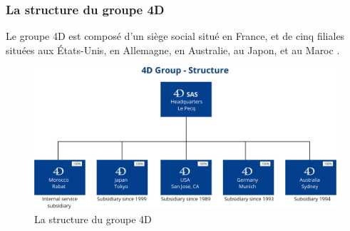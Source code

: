 


\subsubsection{La structure du groupe 4D}
Le groupe 4D est composé d’un siège social situé en France, et de cinq filiales situées
aux États-Unis, en Allemagne, en Australie, au Japon, et au Maroc \cite{4d}.

\begin{figure}[h]
    \centering
    \includegraphics[scale=0.32]{Images/groupe.png} %
    \caption{ La structure du groupe 4D\cite{4d}}
    \label{fig:groupe}
\end{figure}

